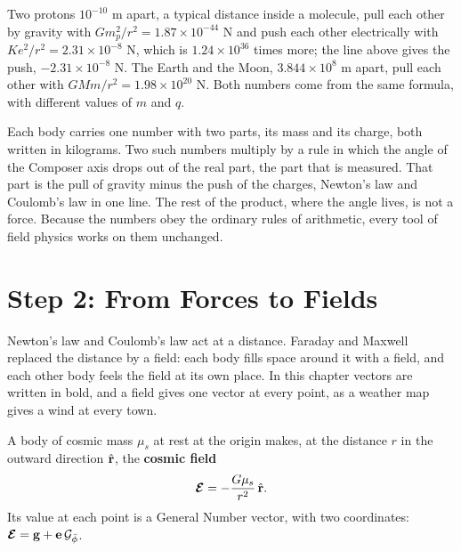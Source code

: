 \begin{workedexample}
Two protons $10^{-10}$ m apart, a typical distance inside a molecule, pull each other by gravity with $G m_p^2/r^2 = 1.87 \times 10^{-44}$ N and push each other electrically with $K e^2/r^2 = 2.31 \times 10^{-8}$ N, which is $1.24 \times 10^{36}$ times more; the line above gives the push, $-2.31 \times 10^{-8}$ N. The Earth and the Moon, $3.844 \times 10^8$ m apart, pull each other with $G M m/r^2 = 1.98 \times 10^{20}$ N. Both numbers come from the same formula, with different values of $m$ and $q$.
\end{workedexample}

\begin{plainwords}
Each body carries one number with two parts, its mass and its charge, both written in kilograms. Two such numbers multiply by a rule in which the angle of the Composer axis drops out of the real part, the part that is measured. That part is the pull of gravity minus the push of the charges, Newton's law and Coulomb's law in one line. The rest of the product, where the angle lives, is not a force. Because the numbers obey the ordinary rules of arithmetic, every tool of field physics works on them unchanged.
\end{plainwords}

\section{Step 2: From Forces to Fields}\label{sec:un-fields}

Newton's law and Coulomb's law act at a distance. Faraday and Maxwell replaced the distance by a field: each body fills space around it with a field, and each other body feels the field at its own place. In this chapter vectors are written in bold, and a field gives one vector at every point, as a weather map gives a wind at every town.

\begin{definition}\label{def:un-field}
A body of cosmic mass $\mu_s$ at rest at the origin makes, at the distance $r$ in the outward direction $\hat{\mathbf{r}}$, the \textbf{cosmic field}
\[
\boldsymbol{\mathcal{E}} = -\frac{G\mu_s}{r^2}\,\hat{\mathbf{r}} .
\]
Its value at each point is a General Number vector, with two coordinates: $\boldsymbol{\mathcal{E}} = \mathbf{g} + \mathbf{e}\,\mathcal{G}_{\bar{\phi}}$.
\end{definition}

